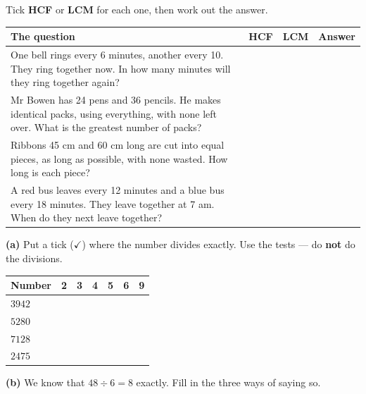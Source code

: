 \documentclass[12pt,a4paper]{article}
\begin{document}
\noindent Tick \textbf{HCF} or \textbf{LCM} for each one, then work out the answer.

\vspace{8pt}
\noindent
\begin{tabularx}{\textwidth}{|X|>{\centering\arraybackslash}p{1.5cm}|>{\centering\arraybackslash}p{1.5cm}|>{\centering\arraybackslash}p{2.6cm}|}
  \hline
  \textbf{The question} & \textbf{HCF} & \textbf{LCM} & \textbf{Answer} \\
  \hline
  One bell rings every 6 minutes, another every 10. They ring together now. In how
  many minutes will they ring together again? & & & \\
  \hline
  Mr Bowen has 24 pens and 36 pencils. He makes identical packs, using everything,
  with none left over. What is the greatest number of packs? & & & \\
  \hline
  Ribbons 45 cm and 60 cm long are cut into equal pieces, as long as possible, with
  none wasted. How long is each piece? & & & \\
  \hline
  A red bus leaves every 12 minutes and a blue bus every 18 minutes. They leave
  together at 7 am. When do they next leave together? & & & \\
  \hline
\end{tabularx}


\noindent\textbf{(a)} Put a tick ($\checkmark$) where the number divides exactly.
Use the tests --- do \textbf{not} do the divisions.

\vspace{8pt}
\noindent
\begin{tabularx}{\textwidth}{|p{2.6cm}|X|X|X|X|X|X|}
  \hline
  \textbf{Number} & \textbf{2} & \textbf{3} & \textbf{4} & \textbf{5} & \textbf{6} & \textbf{9} \\
  \hline
  $3942$ \rule[-0.7em]{0pt}{2.1em} & & & & & & \\ \hline
  $5280$ \rule[-0.7em]{0pt}{2.1em} & & & & & & \\ \hline
  $7128$ \rule[-0.7em]{0pt}{2.1em} & & & & & & \\ \hline
  $2475$ \rule[-0.7em]{0pt}{2.1em} & & & & & & \\ \hline
\end{tabularx}

\vspace{11pt}
\noindent\textbf{(b)}  We know that $48 \div 6 = 8$
exactly. Fill in the three ways of saying so.
\end{document}
